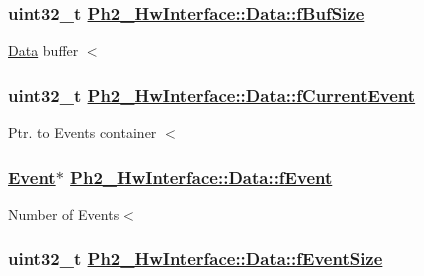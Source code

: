 \hypertarget{class_ph2___hw_interface_1_1_data_af97e7ef5081a4a6a412c25382b3bafe}{
\subsubsection[fBufSize]{\setlength{\rightskip}{0pt plus 5cm}uint32\_\-t \hyperlink{class_ph2___hw_interface_1_1_data_af97e7ef5081a4a6a412c25382b3bafe}{Ph2\_\-Hw\-Interface::Data::f\-Buf\-Size}}}
\label{class_ph2___hw_interface_1_1_data_af97e7ef5081a4a6a412c25382b3bafe}


\hyperlink{class_ph2___hw_interface_1_1_data}{Data} buffer $<$ \hypertarget{class_ph2___hw_interface_1_1_data_4566e332acab8fe25be41f05c2862222}{
\subsubsection[fCurrentEvent]{\setlength{\rightskip}{0pt plus 5cm}uint32\_\-t \hyperlink{class_ph2___hw_interface_1_1_data_4566e332acab8fe25be41f05c2862222}{Ph2\_\-Hw\-Interface::Data::f\-Current\-Event}}}
\label{class_ph2___hw_interface_1_1_data_4566e332acab8fe25be41f05c2862222}


Ptr. to Events container $<$ \hypertarget{class_ph2___hw_interface_1_1_data_255954fc9bd7fc6262b863eb8f044048}{
\subsubsection[fEvent]{\setlength{\rightskip}{0pt plus 5cm}\hyperlink{class_ph2___hw_interface_1_1_event}{Event}$\ast$ \hyperlink{class_ph2___hw_interface_1_1_data_255954fc9bd7fc6262b863eb8f044048}{Ph2\_\-Hw\-Interface::Data::f\-Event}}}
\label{class_ph2___hw_interface_1_1_data_255954fc9bd7fc6262b863eb8f044048}


Number of Events$<$ \hypertarget{class_ph2___hw_interface_1_1_data_3026264d11102e6c31d171d232af9de7}{
\subsubsection[fEventSize]{\setlength{\rightskip}{0pt plus 5cm}uint32\_\-t \hyperlink{class_ph2___hw_interface_1_1_data_3026264d11102e6c31d171d232af9de7}{Ph2\_\-Hw\-Interface::Data::f\-Event\-Size}}}
\label{class_ph2___hw_interface_1_1_data_3026264d11102e6c31d171d232af9de7}


